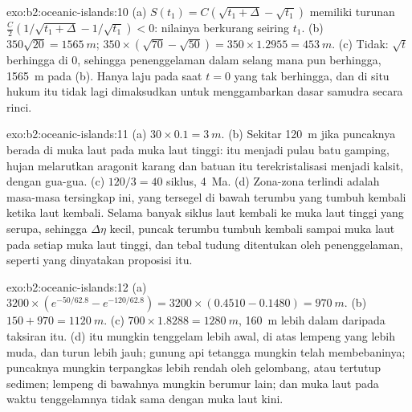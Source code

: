 \begin{solution}{exo:b2:oceanic-islands:10}
(a) $S(t_1) = C(\sqrt{t_1 + \Delta} - \sqrt{t_1})$ memiliki turunan $\frac C2(1/\sqrt{t_1 +
\Delta} - 1/\sqrt{t_1}) < 0$: nilainya berkurang seiring $t_1$. (b) $350\sqrt{20} = \qty{1565}{m}$; $350\times
(\sqrt{70} - \sqrt{50}) = 350\times1.2955 = \qty{453}{m}$. (c) Tidak: $\sqrt t$ berhingga di $0$, sehingga
penenggelaman dalam selang mana pun berhingga, \qty{1565}{m} pada (b). Hanya laju pada saat $t = 0$
yang tak berhingga, dan di situ hukum itu tidak lagi dimaksudkan untuk menggambarkan dasar samudra secara rinci.
\end{solution}

\begin{solution}{exo:b2:oceanic-islands:11}
(a) $30\times0.1 = \qty{3}{m}$. (b) Sekitar \qty{120}{m} jika puncaknya berada di muka laut pada
muka laut tinggi:  itu menjadi pulau batu gamping, hujan melarutkan aragonit karang dan
batuan itu terekristalisasi menjadi kalsit, dengan gua-gua. (c) $120/3 = 40$ siklus, \qty{4}{Ma}. (d) Zona-zona
terlindi adalah masa-masa tersingkap ini, yang tersegel di bawah terumbu yang tumbuh kembali ketika laut kembali.
Selama banyak siklus laut kembali ke muka laut tinggi yang serupa, sehingga $\Delta\eta$ kecil, puncak terumbu
tumbuh kembali sampai muka laut pada setiap muka laut tinggi, dan tebal tudung ditentukan oleh penenggelaman, seperti yang
dinyatakan proposisi itu.
\end{solution}

\begin{solution}{exo:b2:oceanic-islands:12}
(a) $3200\times(e^{-50/62.8} - e^{-120/62.8}) = 3200\times(0.4510 - 0.1480) = \qty{970}{m}$.
(b) $150 + 970 = \qty{1120}{m}$. (c) $700\times1.8288 = \qty{1280}{m}$, \qty{160}{m} lebih dalam daripada
taksiran itu. (d)  itu mungkin tenggelam lebih awal, di atas lempeng yang lebih muda, dan turun lebih jauh; gunung api
tetangga mungkin telah membebaninya; puncaknya mungkin terpangkas lebih rendah oleh gelombang, atau tertutup sedimen;
lempeng di bawahnya mungkin berumur lain; dan muka laut pada waktu tenggelamnya tidak sama dengan
muka laut kini.
\end{solution}


